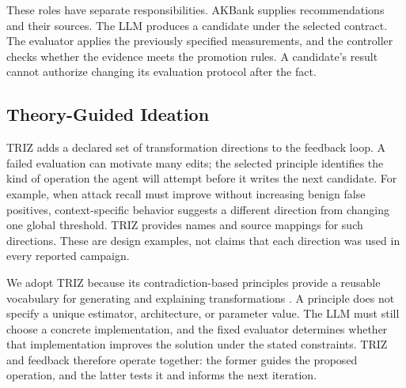\documentclass[manuscript,screen,nonacm]{acmart}
\begin{document}
These roles have separate responsibilities. AKBank supplies recommendations and their sources. The LLM produces a candidate under the selected contract. The evaluator applies the previously specified measurements, and the controller checks whether the evidence meets the promotion rules. A candidate's result cannot authorize changing its evaluation protocol after the fact.

\subsection{Theory-Guided Ideation}
\label{sec:ideation}

TRIZ adds a declared set of transformation directions to the feedback loop. A failed evaluation can motivate many edits; the selected principle identifies the kind of operation the agent will attempt before it writes the next candidate. For example, when attack recall must improve without increasing benign false positives, context-specific behavior suggests a different direction from changing one global threshold. TRIZ provides names and source mappings for such directions. These are design examples, not claims that each direction was used in every reported campaign.

We adopt TRIZ because its contradiction-based principles provide a reusable vocabulary for generating and explaining transformations \citep{altshuller1984,mann2004}. A principle does not specify a unique estimator, architecture, or parameter value. The LLM must still choose a concrete implementation, and the fixed evaluator determines whether that implementation improves the solution under the stated constraints. TRIZ and feedback therefore operate together: the former guides the proposed operation, and the latter tests it and informs the next iteration.
\end{document}
